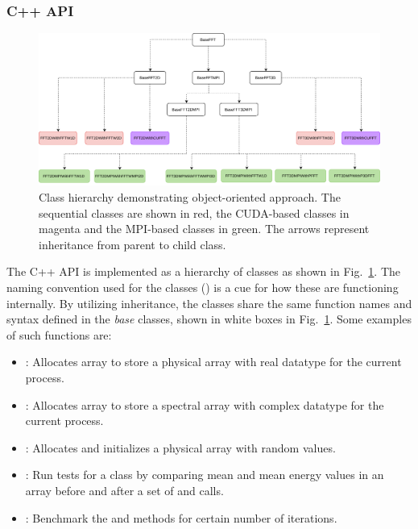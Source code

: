 \subsubsection{C++ API}

\begin{figure}[htp]
  \centering
  \includegraphics[width=\linewidth]{Pyfig/fig_classes}
  \caption{Class hierarchy demonstrating object-oriented approach. The
    sequential classes are shown in red, the CUDA-based classes in magenta and
    the MPI-based classes in green. The arrows represent inheritance from
    parent to child class.
  }\label{fig:classes}
\end{figure}

The C++ API is implemented as a hierarchy of classes as shown in
Fig.~\ref{fig:classes}.
%
The naming convention used for the classes () is a cue for how these are functioning internally.
%
By utilizing inheritance, the classes share the same function names and syntax
defined in the \emph{base} classes, shown in white boxes in
Fig.~\ref{fig:classes}. Some examples of such functions are:

\begin{itemize}
  \item {}: Allocates array to store a physical array
    with real datatype for the current process.
  \item {}: Allocates array to store a spectral array
    with complex datatype  for the current process.
  \item {}: Allocates and initializes a physical
    array with random values.
  \item {}: Run tests for a class by comparing mean and mean energy
    values in an array before and after a set of  and
     calls.
  \item {}: Benchmark the  and
     methods for certain number of iterations.
\end{itemize}

